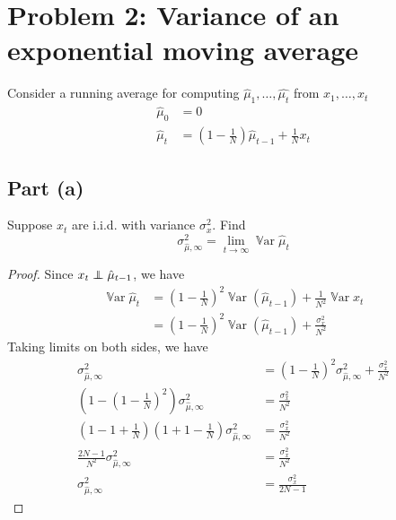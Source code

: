 \documentclass{amsart}
\newcommand\ind{\protect\mathpalette{\protect\independenT}{\perp}}
\def\independenT#1#2{\mathrel{\rlap{$#1#2$}\mkern2mu{#1#2}}}
\DeclareMathOperator{\Var}{\mathbb{V}ar}  %
\theoremstyle{definition}
\begin{document}
\section*{Problem 2: Variance of an exponential moving average}
Consider a running average for computing $\hat{\mu}_1, \ldots, \hat{\mu_t}$ from $x_1, \ldots, x_t$
\begin{align*}
    \hat{\mu}_0 &= 0\\
    \hat{\mu}_t &= \left(
    1 - \frac1{N} 
    \right) \hat{\mu}_{t - 1} + \frac1{N} x_t
\end{align*}
\subsection*{Part (a)} Suppose $x_t$ are i.i.d. with variance $\sigma_x^2$. 
Find 
\[
\sigma_{\hat{\mu}, \infty}^2 = \lim_{t\to\infty} \Var{\hat{\mu}_t}
\]
\begin{proof}
    Since $x_t \ind \hat{\mu}_{t - 1}$, we have
    \begin{align*}
        \Var{\hat{\mu}_t} &= \left(
            1 - \frac1{N}
        \right)^2\Var{ (\hat{\mu}_{t - 1})} + \frac1{N^2} \Var{x_t} \\
        &= \left(1 - \frac1{N}\right)^2 \Var{(\hat{\mu}_{t - 1})} + \frac{\sigma_x^2}{N^2}
    \end{align*}
    Taking limits on both sides, we have
    \begin{align*}
        \sigma_{\hat{\mu}, \infty}^2 &= \left(1 - \frac1{N}\right)^2 \sigma_{\hat{\mu}, \infty}^2 + \frac{\sigma_x^2}{N^2}\\ 
        \left(
            1 - \left(1 - \frac1{N}\right)^2
        \right) \sigma_{\hat{\mu}, \infty}^2 &= \frac{\sigma_x^2}{N^2} \\
        \left(
            1 - 1 + \frac1{N}
        \right)\left(
            1 + 1 - \frac1{N}
        \right) \sigma_{\hat{\mu}, \infty}^2 &= \frac{\sigma_x^2}{N^2} \\
        \frac{2N - 1}{N^2} \sigma_{\hat{\mu}, \infty}^2 &= \frac{\sigma_x^2}{N^2} \\
        \sigma_{\hat{\mu}, \infty}^2 &= \frac{\sigma_x^2}{2N - 1}
    \end{align*}
\end{proof}
\end{document}
